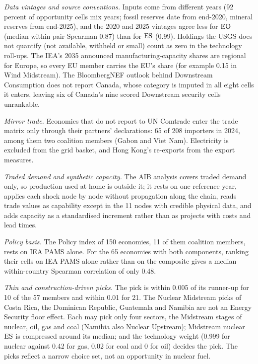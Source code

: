 \emph{Data vintages and source conventions.} Inputs come from different years (92 percent of
opportunity cells mix years; fossil reserves date from end-2020, mineral reserves from end-2025),
and the 2020 and 2025 vintages agree less for $\mathrm{EO}$ (median within-pair Spearman 0.87) than for
$\mathrm{ES}$ (0.99). Holdings the USGS does not quantify (not available, withheld or small) count as zero
in the technology roll-ups. The IEA's 2035 announced manufacturing-capacity shares are regional for
Europe, so every EU member carries the EU's share (for example 0.15 in Wind Midstream). The
BloombergNEF outlook behind Downstream Consumption does not report Canada, whose category is imputed
in all eight cells it enters, leaving six of Canada's nine scored Downstream security cells
unrankable.

\emph{Mirror trade.} Economies that do not report to UN Comtrade enter the trade matrix only
through their partners' declarations: 65 of 208 importers in 2024, among them two coalition members
(Gabon and Viet Nam). Electricity is excluded from the grid basket, and Hong Kong's re-exports from
the export measures.

\emph{Traded demand and synthetic capacity.} The AIB analysis covers traded demand only, so
production used at home is outside it; it rests on one reference year, applies each shock node by node
without propagation along the chain, reads trade values as capability except in the 11 nodes with
credible physical data, and adds capacity as a standardised increment rather than as projects with
costs and lead times.

\emph{Policy basis.} The Policy index of 150 economies, 11 of them coalition members, rests on IEA
PAMS alone. For the 65 economies with both components, ranking their cells on IEA PAMS alone rather
than on the composite gives a median within-country Spearman correlation of only 0.48.

\emph{Thin and construction-driven picks.} The pick is within 0.005 of its runner-up for 10 of the
57 members and within 0.01 for 21. The Nuclear Midstream picks of Costa Rica, the Dominican Republic,
Guatemala and Namibia are not an Energy Security floor effect. Each may pick only four sectors, the
Midstream stages of nuclear, oil, gas and coal (Namibia also Nuclear Upstream); Midstream nuclear $\mathrm{ES}$ is compressed around its
median; and the technology weight (0.999 for nuclear against 0.42 for gas, 0.02 for coal and 0 for
oil) decides the pick. The picks reflect a narrow choice set, not an opportunity in nuclear fuel.


